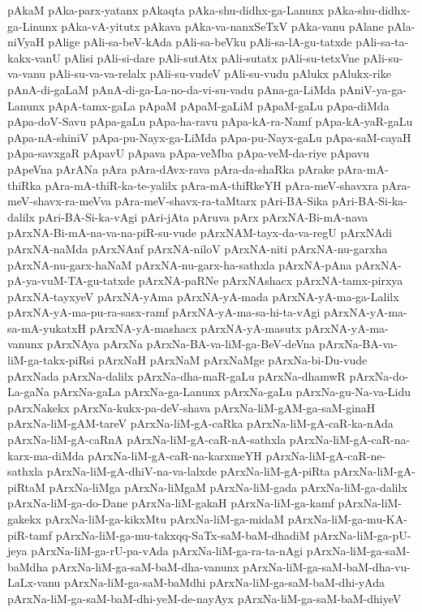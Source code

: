 {pAkaM
pAka-parx-yatanx
pAkaqta
pAka-shu-didhx-ga-Lanunx
pAka-shu-didhx-ga-Linunx
pAka-vA-yitutx
pAkava
pAka-va-nanxSeTxV
pAka-vanu
pAlane
pAla-niVyaH
pAlige
pAli-sa-beV-kAda
pAli-sa-beVku
pAli-sa-lA-gu-tatxde
pAli-sa-ta-kakx-vanU
pAlisi
pAli-si-dare
pAli-sutAtx
pAli-sutatx
pAli-su-tetxVne
pAli-su-va-vanu
pAli-su-va-va-relalx
pAli-su-vudeV
pAli-su-vudu
pAlukx
pAlukx-rike
pAnA-di-gaLaM
pAnA-di-ga-La-no-da-vi-su-vadu
pAna-ga-LiMda
pAniV-ya-ga-Lanunx
pApA-tamx-gaLa
pApaM
pApaM-gaLiM
pApaM-gaLu
pApa-diMda
pApa-doV-Savu
pApa-gaLu
pApa-ha-ravu
pApa-kA-ra-Namf
pApa-kA-yaR-gaLu
pApa-nA-shiniV
pApa-pu-Nayx-ga-LiMda
pApa-pu-Nayx-gaLu
pApa-saM-cayaH
pApa-savxgaR
pApavU
pApava
pApa-veMba
pApa-veM-da-riye
pApavu
pApeVna
pArANa
pAra
pAra-dAvx-rava
pAra-da-shaRka
pArake
pAra-mA-thiRka
pAra-mA-thiR-ka-te-yalilx
pAra-mA-thiRkeYH
pAra-meV-shavxra
pAra-meV-shavx-ra-meVva
pAra-meV-shavx-ra-taMtarx
pAri-BA-Sika
pAri-BA-Si-ka-dalilx
pAri-BA-Si-ka-vAgi
pAri-jAta
pAruva
pArx
pArxNA-Bi-mA-nava
pArxNA-Bi-mA-na-va-na-piR-su-vude
pArxNAM-tayx-da-va-regU
pArxNAdi
pArxNA-naMda
pArxNAnf
pArxNA-niloV
pArxNA-niti
pArxNA-nu-garxha
pArxNA-nu-garx-haNaM
pArxNA-nu-garx-ha-sathxla
pArxNA-pAna
pArxNA-pA-ya-vuM-TA-gu-tatxde
pArxNA-paRNe
pArxNAshacx
pArxNA-tamx-pirxya
pArxNA-tayxyeV
pArxNA-yAma
pArxNA-yA-mada
pArxNA-yA-ma-ga-Lalilx
pArxNA-yA-ma-pu-ra-sasx-ramf
pArxNA-yA-ma-sa-hi-ta-vAgi
pArxNA-yA-ma-sa-mA-yukatxH
pArxNA-yA-mashacx
pArxNA-yA-masutx
pArxNA-yA-ma-vanunx
pArxNAya
pArxNa
pArxNa-BA-va-liM-ga-BeV-deVna
pArxNa-BA-va-liM-ga-takx-piRsi
pArxNaH
pArxNaM
pArxNaMge
pArxNa-bi-Du-vude
pArxNada
pArxNa-dalilx
pArxNa-dha-maR-gaLu
pArxNa-dhamwR
pArxNa-do-La-gaNa
pArxNa-gaLa
pArxNa-ga-Lanunx
pArxNa-gaLu
pArxNa-gu-Na-va-Lidu
pArxNakekx
pArxNa-kukx-pa-deV-shava
pArxNa-liM-gAM-ga-saM-ginaH
pArxNa-liM-gAM-tareV
pArxNa-liM-gA-caRka
pArxNa-liM-gA-caR-ka-nAda
pArxNa-liM-gA-caRnA
pArxNa-liM-gA-caR-nA-sathxla
pArxNa-liM-gA-caR-na-karx-ma-diMda
pArxNa-liM-gA-caR-na-karxmeYH
pArxNa-liM-gA-caR-ne-sathxla
pArxNa-liM-gA-dhiV-na-va-lalxde
pArxNa-liM-gA-piRta
pArxNa-liM-gA-piRtaM
pArxNa-liMga
pArxNa-liMgaM
pArxNa-liM-gada
pArxNa-liM-ga-dalilx
pArxNa-liM-ga-do-Dane
pArxNa-liM-gakaH
pArxNa-liM-ga-kamf
pArxNa-liM-gakekx
pArxNa-liM-ga-kikxMtu
pArxNa-liM-ga-midaM
pArxNa-liM-ga-mu-KA-piR-tamf
pArxNa-liM-ga-mu-takxqq-SaTx-saM-baM-dhadiM
pArxNa-liM-ga-pU-jeya
pArxNa-liM-ga-rU-pa-vAda
pArxNa-liM-ga-ra-ta-nAgi
pArxNa-liM-ga-saM-baMdha
pArxNa-liM-ga-saM-baM-dha-vanunx
pArxNa-liM-ga-saM-baM-dha-vu-LaLx-vanu
pArxNa-liM-ga-saM-baMdhi
pArxNa-liM-ga-saM-baM-dhi-yAda
pArxNa-liM-ga-saM-baM-dhi-yeM-de-nayAyx
pArxNa-liM-ga-saM-baM-dhiyeV
}
